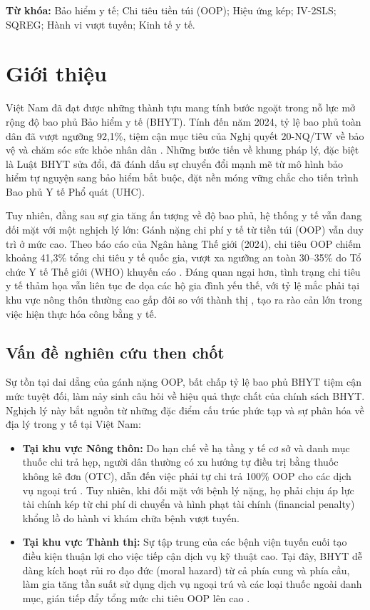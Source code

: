 \documentclass[12pt,a4paper]{article}
\begin{document}
\vspace{0.5em}
\noindent \textbf{Từ khóa:} Bảo hiểm y tế; Chi tiêu tiền túi (OOP); Hiệu ứng kép; IV-2SLS; SQREG; Hành vi vượt tuyến; Kinh tế y tế.

\newpage
\section{Giới thiệu}

Việt Nam đã đạt được những thành tựu mang tính bước ngoặt trong nỗ lực mở rộng độ bao phủ Bảo hiểm y tế (BHYT). Tính đến năm 2024, tỷ lệ bao phủ toàn dân đã vượt ngưỡng 92,1\%, tiệm cận mục tiêu của Nghị quyết 20-NQ/TW về bảo vệ và chăm sóc sức khỏe nhân dân \parencite{gso2024}. Những bước tiến về khung pháp lý, đặc biệt là Luật BHYT sửa đổi, đã đánh dấu sự chuyển đổi mạnh mẽ từ mô hình bảo hiểm tự nguyện sang bảo hiểm bắt buộc, đặt nền móng vững chắc cho tiến trình Bao phủ Y tế Phổ quát (UHC).

Tuy nhiên, đằng sau sự gia tăng ấn tượng về độ bao phủ, hệ thống y tế vẫn đang đối mặt với một nghịch lý lớn: Gánh nặng chi phí y tế từ tiền túi (OOP) vẫn duy trì ở mức cao. Theo báo cáo của Ngân hàng Thế giới (2024), chi tiêu OOP chiếm khoảng 41,3\% tổng chi tiêu y tế quốc gia, vượt xa ngưỡng an toàn 30--35\% do Tổ chức Y tế Thế giới (WHO) khuyến cáo \parencite{who2023}. Đáng quan ngại hơn, tình trạng chi tiêu y tế thảm họa vẫn liên tục đe dọa các hộ gia đình yếu thế, với tỷ lệ mắc phải tại khu vực nông thôn thường cao gấp đôi so với thành thị \parencite{gso2024}, tạo ra rào cản lớn trong việc hiện thực hóa công bằng y tế.

\subsection{Vấn đề nghiên cứu then chốt}

Sự tồn tại dai dẳng của gánh nặng OOP, bất chấp tỷ lệ bao phủ BHYT tiệm cận mức tuyệt đối, làm nảy sinh câu hỏi về hiệu quả thực chất của chính sách BHYT. Nghịch lý này bắt nguồn từ những đặc điểm cấu trúc phức tạp và sự phân hóa về địa lý trong y tế tại Việt Nam:

\begin{itemize}
	\item \textbf{Tại khu vực Nông thôn:} Do hạn chế về hạ tầng y tế cơ sở và danh mục thuốc chi trả hẹp, người dân thường có xu hướng tự điều trị bằng thuốc không kê đơn (OTC), dẫn đến việc phải tự chi trả 100\% OOP cho các dịch vụ ngoại trú \parencite{lee2019ijerph}. Tuy nhiên, khi đối mặt với bệnh lý nặng, họ phải chịu áp lực tài chính kép từ chi phí di chuyển và hình phạt tài chính (financial penalty) khổng lồ do hành vi khám chữa bệnh vượt tuyến.
	
	\item \textbf{Tại khu vực Thành thị:} Sự tập trung của các bệnh viện tuyến cuối tạo điều kiện thuận lợi cho việc tiếp cận dịch vụ kỹ thuật cao. Tại đây, BHYT dễ dàng kích hoạt rủi ro đạo đức (moral hazard) từ cả phía cung và phía cầu, làm gia tăng tần suất sử dụng dịch vụ ngoại trú và các loại thuốc ngoài danh mục, gián tiếp đẩy tổng mức chi tiêu OOP lên cao \parencite{thuong2020did}.
\end{itemize}
\end{document}
